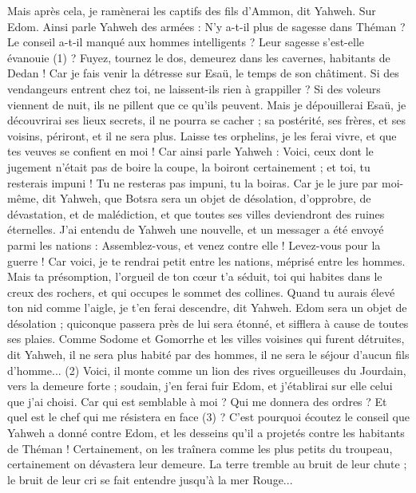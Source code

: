 \begin{multicols}{2}
Mais après cela, je ramènerai les captifs des fils d'Ammon, dit Yahweh.
Sur Edom. Ainsi parle Yahweh des armées : N'y a-t-il plus de sagesse dans Théman ? Le conseil a-t-il manqué aux hommes intelligents ? Leur sagesse s'est-elle évanouie\FTNT{} (1) ?
Fuyez, tournez le dos, demeurez dans les cavernes, habitants de Dedan ! Car je fais venir la détresse sur Esaü, le temps de son châtiment.
Si des vendangeurs entrent chez toi, ne laissent-ils rien à grappiller ? Si des voleurs viennent de nuit, ils ne pillent que ce qu'ils peuvent.
Mais je dépouillerai Esaü, je découvrirai ses lieux secrets, il ne pourra se cacher ; sa postérité, ses frères, et ses voisins, périront, et il ne sera plus.
Laisse tes orphelins, je les ferai vivre, et que tes veuves se confient en moi !
Car ainsi parle Yahweh : Voici, ceux dont le jugement n’était pas de boire la coupe, la boiront certainement ; et toi, tu resterais impuni ! Tu ne resteras pas impuni, tu la boiras.
Car je le jure par moi-même, dit Yahweh, que Botsra sera un objet de désolation, d’opprobre, de dévastation, et de malédiction, et que toutes ses villes deviendront des ruines éternelles.
J'ai entendu de Yahweh une nouvelle, et un messager a été envoyé parmi les nations : Assemblez-vous, et venez contre elle ! Levez-vous pour la guerre !
Car voici, je te rendrai petit entre les nations, méprisé entre les hommes.
Mais ta présomption, l'orgueil de ton cœur t'a séduit, toi qui habites dans le creux des rochers, et qui occupes le sommet des collines. Quand tu aurais élevé ton nid comme l'aigle, je t'en ferai descendre, dit Yahweh.
Edom sera un objet de désolation ; quiconque passera près de lui sera étonné, et sifflera à cause de toutes ses plaies.
Comme Sodome et Gomorrhe et les villes voisines qui furent détruites, dit Yahweh, il ne sera plus habité par des hommes, il ne sera le séjour d'aucun fils d'homme...\FTNT{} (2)
Voici, il monte comme un lion des rives orgueilleuses du Jourdain, vers la demeure forte ; soudain, j'en ferai fuir Edom, et j'établirai sur elle celui que j'ai choisi. Car qui est semblable à moi ? Qui me donnera des ordres ? Et quel est le chef qui me résistera en face\FTNT{} (3) ?
C'est pourquoi écoutez le conseil que Yahweh a donné contre Edom, et les desseins qu'il a projetés contre les habitants de Théman ! Certainement, on les traînera comme les plus petits du troupeau, certainement on dévastera leur demeure.
La terre tremble au bruit de leur chute ; le bruit de leur cri se fait entendre jusqu'à la mer Rouge...

\end{multicols}
